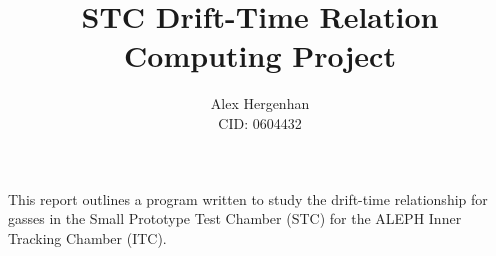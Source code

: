 \documentclass[11pt]{article}
\begin{document}
\title{STC Drift-Time Relation\\\normalsize Computing Project}
\author{Alex Hergenhan\\CID: 0604432}
\maketitle

This report outlines a program written to study the drift-time relationship for gasses in the Small Prototype Test Chamber (STC) for the ALEPH Inner Tracking Chamber (ITC).
\end{document}
